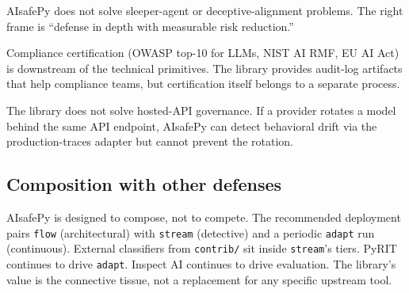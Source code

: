 AIsafePy does not solve sleeper-agent or deceptive-alignment
problems. The right frame is ``defense in depth with measurable
risk reduction.''

Compliance certification (OWASP top-10 for LLMs, NIST AI RMF, EU AI
Act) is downstream of the technical primitives. The library
provides audit-log artifacts that help compliance teams, but
certification itself belongs to a separate process.

The library does not solve hosted-API governance. If a provider
rotates a model behind the same API endpoint, AIsafePy can detect
behavioral drift via the production-traces adapter but cannot
prevent the rotation.

\subsection{Composition with other defenses}

AIsafePy is designed to compose, not to compete. The recommended
deployment pairs \texttt{flow} (architectural) with \texttt{stream}
(detective) and a periodic \texttt{adapt} run (continuous).
External classifiers from \texttt{contrib/} sit inside
\texttt{stream}'s tiers. PyRIT continues to drive \texttt{adapt}.
Inspect AI continues to drive evaluation. The library's value is
the connective tissue, not a replacement for any specific upstream
tool.
